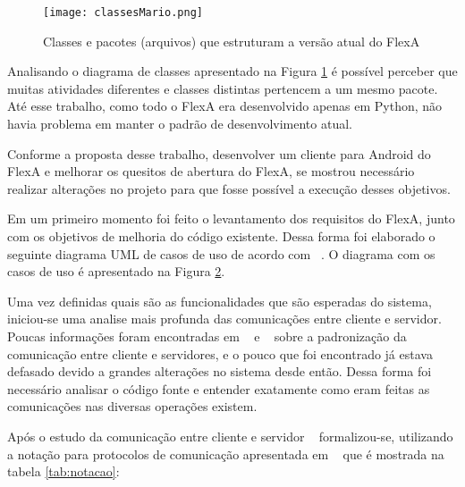         \begin{figure}[!ht]
        \centering
        \texttt{[image: classesMario.png]}
        \caption{Classes e pacotes (arquivos) que estruturam a versão atual do FlexA}
        \label{fig:classesMario}
        \end{figure}
             

        Analisando o diagrama de classes apresentado na Figura \ref{fig:classesMario} é possível perceber que muitas atividades diferentes e classes distintas pertencem a um mesmo pacote. Até esse trabalho, como todo o FlexA era desenvolvido apenas em Python, não havia problema em manter o padrão de desenvolvimento atual. 
        
        Conforme a proposta desse trabalho, desenvolver um cliente para Android do FlexA e melhorar os quesitos de abertura do FlexA, se mostrou necessário realizar alterações no projeto para que fosse possível a execução desses objetivos.
        
        Em um primeiro momento foi feito o levantamento dos requisitos do FlexA, junto com os objetivos de melhoria do código existente. Dessa forma foi elaborado o seguinte diagrama UML de casos de uso de acordo com ~\cite{umlCasosDeUso}. O diagrama com os casos de uso é apresentado na Figura \ref{fig:casosDeUsoGabriel}.
        
        \begin{figure}
        \label{fig:casosDeUsoGabriel}
        \end{figure}
    
        Uma vez definidas quais são as funcionalidades que são esperadas do sistema, iniciou-se uma analise mais profunda das comunicações entre cliente e servidor. Poucas informações foram encontradas em ~\cite{mario} e ~\cite{silas} sobre a padronização da comunicação entre cliente e servidores, e o pouco que foi encontrado já estava defasado devido a grandes alterações no sistema desde então. Dessa forma foi necessário analisar o código fonte e entender exatamente como eram feitas as comunicações nas diversas operações existem.
        
        
        
        
        
        
        
        Após o estudo da comunicação entre cliente e servidor ~\cite{mario} formalizou-se, utilizando a notação para protocolos de comunicação apresentada em ~\cite{ross} que é mostrada na tabela \ref{tab:notacao}:
        
